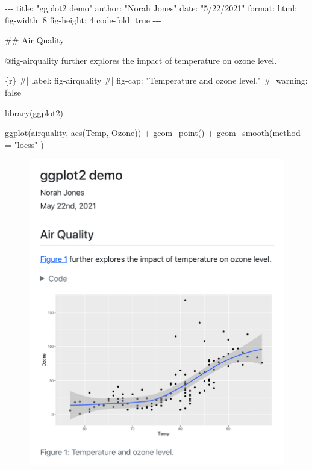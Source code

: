 \documentclass[
  letterpaper,
]{article}
\newenvironment{Shaded}{}{}
\newcommand{\AnnotationTok}[1]{\textcolor[rgb]{0.42,0.45,0.49}{#1}}
\newcommand{\AttributeTok}[1]{\textcolor[rgb]{0.84,0.23,0.29}{#1}}
\newcommand{\CommentTok}[1]{\textcolor[rgb]{0.42,0.45,0.49}{#1}}
\newcommand{\FunctionTok}[1]{\textcolor[rgb]{0.44,0.26,0.76}{#1}}
\newcommand{\InformationTok}[1]{\textcolor[rgb]{0.42,0.45,0.49}{#1}}
\newcommand{\NormalTok}[1]{\textcolor[rgb]{0.14,0.16,0.18}{#1}}
\newcommand{\SpecialCharTok}[1]{\textcolor[rgb]{0.00,0.36,0.77}{#1}}
\newcommand{\StringTok}[1]{\textcolor[rgb]{0.01,0.18,0.38}{#1}}
\begin{document}
\begin{Shaded}
\begin{Highlighting}[]
\CommentTok{{-}{-}{-}}
\AnnotationTok{title:}\CommentTok{ "ggplot2 demo"}
\AnnotationTok{author:}\CommentTok{ "Norah Jones"}
\AnnotationTok{date:}\CommentTok{ "5/22/2021"}
\AnnotationTok{format:}\CommentTok{ }
\CommentTok{  html:}
\CommentTok{    fig{-}width: 8}
\CommentTok{    fig{-}height: 4}
\CommentTok{    code{-}fold: true}
\CommentTok{{-}{-}{-}}

\FunctionTok{\#\# Air Quality}

\NormalTok{@fig{-}airquality further explores the impact of temperature on ozone level.}

\InformationTok{\textasciigrave{}\textasciigrave{}\textasciigrave{}\{r\}}
\CommentTok{\#| label: fig{-}airquality}
\CommentTok{\#| fig{-}cap: "Temperature and ozone level."}
\CommentTok{\#| warning: false}

\FunctionTok{library}\NormalTok{(ggplot2)}

\FunctionTok{ggplot}\NormalTok{(airquality, }\FunctionTok{aes}\NormalTok{(Temp, Ozone)) }\SpecialCharTok{+} 
  \FunctionTok{geom\_point}\NormalTok{() }\SpecialCharTok{+} 
  \FunctionTok{geom\_smooth}\NormalTok{(}\AttributeTok{method =} \StringTok{"loess"}
\NormalTok{)}
\InformationTok{\textasciigrave{}\textasciigrave{}\textasciigrave{}}
\end{Highlighting}
\end{Shaded}

\begin{figure}

{\centering \includegraphics{images/hello-knitr.png}

}

\end{figure}
\end{document}
